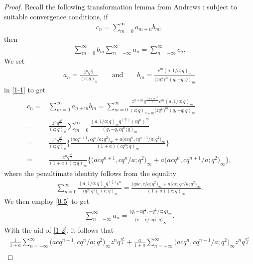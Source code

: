 \documentclass[10pt,a4paper]{amsart}
\numberwithin{equation}{section}
\begin{document}
\begin{proof}
 Recall the following transformation lemma from Andrews \cite{A}: subject to suitable convergence conditions, if
\begin{align}\label{1-1}
c_{n}=\sum_{m=0}^{\infty}a_{m+n}b_{m},
\end{align}
then
\begin{align}\label{1-2}
\sum_{m=0}^{\infty}b_{m}\sum_{n=-\infty}^{\infty}a_{n}
=\sum_{n=-\infty}^{\infty}c_{n}.
\end{align}
We set
\begin{align*}
a_n=\frac{z^nq^{\frac{n^2}{2}}}{(c;q)_n} \qquad \text{and} \qquad
b_m=\frac{c^m(a,1/a;q)_m}{\bigl(zq^{\frac{1}{2}}\bigr)^m(q,-q;q)_m}
\end{align*}
in \eqref{1-1} to get
\begin{align*}
c_n={}&\sum_{m=0}^{\infty}a_{n+m}b_m
=\sum_{m=0}^{\infty}\frac{z^{n+m}q^{\frac{(n+m)^2}{2}}c^m(a,1/a;q)_m}
{(c;q)_{n+m}\bigl(zq^{\frac{1}{2}}\bigr)^m(q,-q;q)_m}\\
={}&\frac{z^nq^{\frac{n^2}{2}}}{(c;q)_n}\sum_{m=0}^{\infty}
\frac{(a,1/a;q)_mq^{m\choose2}(cq^n)^m}
{(q,-q,cq^n;q)_m}\\
={}&\frac{z^nq^{\frac{n^2}{2}}}{(c;q)_n}
\bigg\{\frac{\bigl(acq^{n+1},cq^n/a;q^2\bigr)_{\infty}
+a\bigl(acq^n,cq^{n+1}/a;q^2\bigr)_{\infty}}{(1+a)(cq^n;q)_{\infty}}\bigg\}\\
={}&\frac{z^nq^{\frac{n^2}{2}}}{(1+a)(c;q)_{\infty}}
\big\{\bigl(acq^{n+1},cq^n/a;q^2\bigr)_{\infty}
+a\bigl(acq^n,cq^{n+1}/a;q^2\bigr)_{\infty}\big\},
\end{align*}
where the penultimate identity follows from the equality \cite[Example~8]{ZS2}
\begin{align*}
\sum_{n=0}^{\infty}\frac{(a,1/a;q)_nq^{n\choose2}c^n}{\bigl(q^2;q^2\bigr)_n(c;q)_n}
=\frac{\bigl(qac,c/a;q^2\bigr)_{\infty}+a\bigl(ac,qc/a;q^2\bigr)_{\infty}}{(1+a)(c;q)_{\infty}}.
\end{align*}
We then employ \eqref{0-5} to get
\begin{align*}
\sum_{n=-\infty}^{\infty}a_n=\frac{\bigl(q,-zq^{\frac{1}{2}},-q^{\frac{1}{2}}/z;q\bigr)_{\infty}}
{\bigl(c,-c/zq^{\frac{1}{2}};q\bigr)_{\infty}}.
\end{align*}
With the aid of \eqref{1-2}, it follows that
\begin{gather*}
\frac{1}{1+a}\sum_{n=-\infty}^{\infty}
\bigl(acq^{n+1},cq^n/a;q^2\bigr)_{\infty}z^nq^{\frac{n^2}{2}}+\frac{a}{1+a}\sum_{n=-\infty}^{\infty}
\bigl(acq^n,cq^{n+1}/a;q^2\bigr)_{\infty}z^nq^{\frac{n^2}{2}}\\

\end{gather*}
\end{proof}
\end{document}
